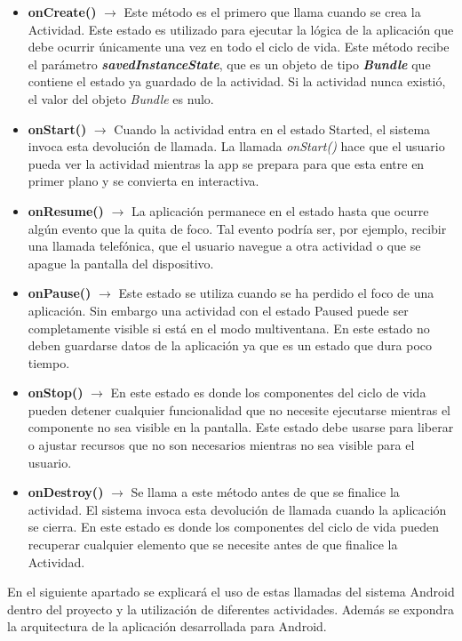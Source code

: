 \begin {itemize}
\item \textbf{onCreate()} $\rightarrow$ Este m\'etodo es el primero que llama cuando se crea la Actividad. Este estado es utilizado para ejecutar la l\'ogica de la aplicaci\'on que debe ocurrir \'unicamente una vez en todo el ciclo de vida. Este m\'etodo recibe el par\'ametro \textit{\textbf{savedInstanceState}}, que es un objeto de tipo \textbf{\textit{Bundle}} que contiene el estado ya guardado de la actividad. Si la actividad nunca existi\'o, el valor del objeto \textit{Bundle} es nulo.
\item \textbf{onStart()} $\rightarrow$ Cuando la actividad entra en el estado Started, el sistema invoca esta devoluci\'on de llamada. La llamada \textit{onStart()} hace que el usuario pueda ver la actividad mientras la app se prepara para que esta entre en primer plano y se convierta en interactiva.
\item \textbf{onResume()} $\rightarrow$  La aplicaci\'on permanece en el estado \textit{} hasta que ocurre alg\'un evento que la quita de foco. Tal evento podr\'ia ser, por ejemplo, recibir una llamada telef\'onica, que el usuario navegue a otra actividad o que se apague la pantalla del dispositivo.
\item \textbf{onPause()} $\rightarrow$ Este estado se utiliza cuando se ha perdido el foco de una aplicaci\'on. Sin embargo una actividad con el estado Paused puede ser completamente visible si est\'a en el modo multiventana. En este estado no deben guardarse datos de la aplicaci\'on ya que es un estado que dura poco tiempo.
\item \textbf{onStop()} $\rightarrow$ En este estado es donde los componentes del ciclo de vida pueden detener cualquier funcionalidad que no necesite ejecutarse mientras el componente no sea visible en la pantalla. Este estado debe usarse para liberar o ajustar recursos que no son necesarios mientras no sea visible para el usuario.
\item \textbf{onDestroy()} $\rightarrow$ Se llama a este m\'etodo antes de que se finalice la actividad. El sistema invoca esta devoluci\'on de llamada cuando la aplicaci\'on se cierra. En este estado es donde los componentes del ciclo de vida pueden recuperar cualquier elemento que se necesite antes de que finalice la Actividad.
\end {itemize}

En el siguiente apartado se explicar\'a el uso de estas llamadas del sistema Android dentro del proyecto y la utilizaci\'on de diferentes actividades. Adem\'as se expondra la arquitectura de la aplicaci\'on desarrollada para Android.


